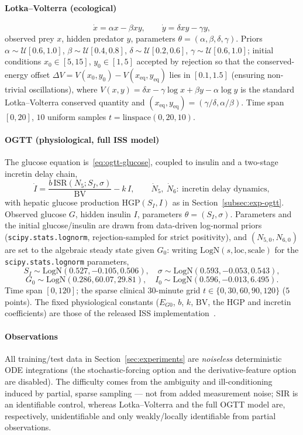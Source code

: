 \paragraph{Lotka--Volterra (ecological)}
\[
\dot x=\alpha x-\beta x y,\qquad
\dot y=\delta x y-\gamma y,
\]
observed prey $x$, hidden predator $y$, parameters $\theta=(\alpha,\beta,\delta,\gamma)$. Priors
$\alpha\sim\mathcal{U}[0.6,1.0]$, $\beta\sim\mathcal{U}[0.4,0.8]$, $\delta\sim\mathcal{U}[0.2,0.6]$,
$\gamma\sim\mathcal{U}[0.6,1.0]$; initial conditions $x_0\in[5,15]$, $y_0\in[1,5]$ accepted by
rejection so that the conserved-energy offset $\Delta V=V(x_0,y_0)-V(x_{\mathrm{eq}},y_{\mathrm{eq}})$ lies
in $[0.1,1.5]$ (ensuring non-trivial oscillations), where $V(x,y)=\delta x-\gamma\log x+\beta y-\alpha\log y$
is the standard Lotka--Volterra conserved quantity and $(x_{\mathrm{eq}},y_{\mathrm{eq}})=(\gamma/\delta,\alpha/\beta)$.
Time span $[0,20]$, $10$ uniform samples $t=\mathrm{linspace}(0,20,10)$.

\paragraph{OGTT (physiological, full ISS model)} The glucose equation is~\eqref{eq:ogtt-glucose}, coupled
to insulin and a two-stage incretin delay chain,
\[
\dot I=\frac{b\,\mathrm{ISR}(N_5;S_I,\sigma)}{\mathrm{BV}}-k\,I,\qquad
\dot N_5,\ \dot N_6:\ \text{incretin delay dynamics},
\]
with hepatic glucose production $\mathrm{HGP}(S_I,I)$ as in Section~\ref{subsec:exp-ogtt}. Observed glucose
$G$, hidden insulin $I$, parameters $\theta=(S_I,\sigma)$. Parameters and the initial glucose/insulin are
drawn from data-driven log-normal priors (\texttt{scipy.stats.lognorm}, rejection-sampled for strict
positivity), and $(N_{5,0},N_{6,0})$ are set to the algebraic steady state given $G_0$:
writing $\mathrm{LogN}(s,\mathrm{loc},\mathrm{scale})$ for the \texttt{scipy.stats.lognorm} parameters,
\[
S_I\sim\mathrm{LogN}(0.527,-0.105,0.506),\quad
\sigma\sim\mathrm{LogN}(0.593,-0.053,0.543),
\]
\[
G_0\sim\mathrm{LogN}(0.286,60.07,29.81),\quad
I_0\sim\mathrm{LogN}(0.596,-0.013,6.495).
\]
Time span $[0,120]$; the sparse clinical $30$-minute grid $t\in\{0,30,60,90,120\}$ ($5$ points). The fixed
physiological constants ($E_{G0}$, $b$, $k$, $\mathrm{BV}$, the HGP and incretin coefficients) are those of
the released ISS implementation~\cite{ha2024iss}.

\paragraph{Observations} All training/test data in Section~\ref{sec:experiments} are \emph{noiseless}
deterministic ODE integrations (the stochastic-forcing option and the derivative-feature option are
disabled). The difficulty comes from the ambiguity and ill-conditioning induced by partial, sparse
sampling --- not from added measurement noise; SIR is an identifiable control, whereas Lotka--Volterra and
the full OGTT model are, respectively, unidentifiable and only weakly/locally identifiable from partial
observations.

